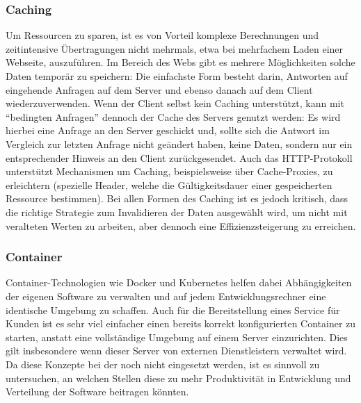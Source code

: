 \subsubsection{Caching}
Um Ressourcen zu sparen, ist es von Vorteil komplexe Berechnungen und zeitintensive Übertragungen nicht mehrmals, etwa bei mehrfachem Laden einer Webseite, auszuführen. Im Bereich des Webs gibt es mehrere Möglichkeiten solche Daten temporär zu speichern: Die einfachste Form besteht darin, Antworten auf eingehende Anfragen auf dem Server und ebenso danach auf dem Client wiederzuverwenden. Wenn der Client selbst kein Caching unterstützt, kann mit ``bedingten Anfragen'' dennoch der Cache des Servers genutzt werden: Es wird hierbei eine Anfrage an den Server geschickt und, sollte sich die Antwort im Vergleich zur letzten Anfrage nicht geändert haben, keine Daten, sondern nur ein entsprechender Hinweis an den Client zurückgesendet. Auch das HTTP-Protokoll unterstützt Mechanismen um Caching, beispielsweise über Cache-Proxies, zu erleichtern (spezielle Header, welche die Gültigkeitsdauer einer gespeicherten Ressource bestimmen). Bei allen Formen des Caching ist es jedoch kritisch, dass die richtige Strategie zum Invalidieren der Daten ausgewählt wird, um nicht mit veralteten Werten zu arbeiten, aber dennoch eine Effizienzsteigerung zu erreichen.

\subsubsection{Container}
Container-Technologien wie Docker und Kubernetes helfen dabei Abhängigkeiten der eigenen Software zu verwalten und auf jedem Entwicklungsrechner eine identische Umgebung zu schaffen. Auch für die Bereitstellung eines Service für Kunden ist es sehr viel einfacher einen bereits korrekt konfigurierten Container zu starten, anstatt eine vollständige Umgebung auf einem Server einzurichten. Dies gilt insbesondere wenn dieser Server von externen Dienstleistern verwaltet wird. Da diese Konzepte bei der  noch nicht eingesetzt werden, ist es sinnvoll zu untersuchen, an welchen Stellen diese zu mehr Produktivität in Entwicklung und Verteilung der Software beitragen könnten.

